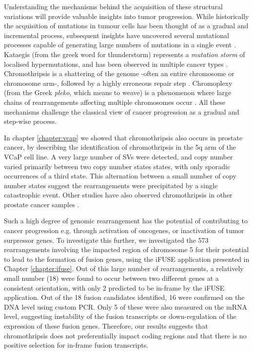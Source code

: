 Understanding the mechanisms behind the acquisition of these structural variations will provide valuable insights into tumor progression.
While historically the acquisition of mutations in tumour cells has been thought of as a gradual and incremental process, subsequent insights have uncovered several mutational processes capable of generating large numbers of mutations in a single event \cite{cortes2020comprehensive,willis2015}.
Kataegis (from the greek word for thunderstorm) represents a \emph{mutation storm} of localised hypermutations, and has been observed in multiple cancer types \cite{nik2012mutational,davis2014somatic}.
Chromothripsis is a shattering of the genome -often an entire chromosome or chromosome arm-, followed by a highly erroneous repair step \cite{stephens2011massive,maher2012chromothripsis}.
Chromoplexy (from the Greek \emph{pleko}, which means to weave) is a phenomenon where large chains of rearrangements affecting multiple chromosomes occur \cite{shen2013chromoplexy}. All these mechanisms challenge the classical view of cancer progression as a gradual and step-wise process.

In chapter \ref{chapter:vcap} we showed that chromothripsis also occurs in prostate cancer, by describing the identification of chromothripsis in the 5q arm of the VCaP cell line. A very large number of SVs were detected, and copy number varied primarily between two copy number states states, with only sporadic occurrences of a third state. This alternation between a small number of copy number states suggest the rearrangements were precipitated by a single catastrophic event.
Other studies have also observed chromothripsis in other prostate cancer samples \cite{wu2012poly,Baca2013}.

Such a high degree of genomic rearrangement has the potential of contributing to cancer progression e.g. through activation of oncogenes, or inactivation of tumor surpressor genes.
To investigate this further, we investigated the 573 rearrangements involving the impacted region of chromosome 5 for their potential to lead to the formation of fusion genes, using the iFUSE application presented in Chapter \ref{chapter:ifuse}.
Out of this large number of rearrangements, a relatively small number (18) were found to occur between two different genes at a consistent orientation, with only 2 predicted to be in-frame by the iFUSE application.
Out of the 18 fusion candidates identified, 16 were confirmed on the DNA level using custom PCR.
Only 5 of these were also measured on the mRNA level, suggesting instability of the fusion transcripts or down-regulation of the expression of these fusion genes.
Therefore, our results suggests that chromothripsis does not preferentially impact coding regions and that there is no positive selection for in-frame fusion transcripts.

